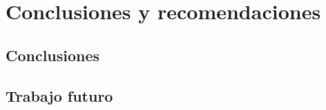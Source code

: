 \chapter{Conclusiones y recomendaciones}

\lipsum[1-2]

\section{Conclusiones}
\lipsum[1-2]

\section{Trabajo futuro}
\lipsum[1-2]
